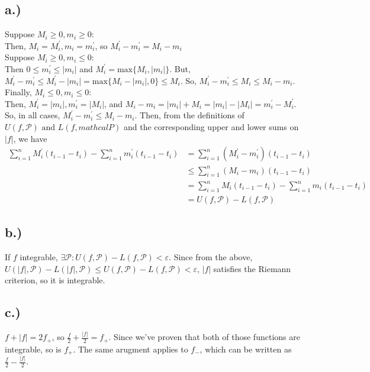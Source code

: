 \documentclass{article}
\newcommand{\mprime}{m_{i}^{\prime}}
\newcommand{\Mprime}{M_{i}^{\prime}}
\newcommand{\M}{M_{i}}
\newcommand{\m}{m_{i}}
\begin{document}
\subsection*{a.)}
Suppose $M_{i} \geq 0, m_{i} \geq 0$:\\
Then, $M_{i} = M_{i}^{\prime}, m_{i} = m_{i}^{\prime}$, so $M_{i}^{\prime} -  \mprime = \M - \m$\\

Suppose $M_{i} \geq 0, m_{i} \leq 0$:\\
Then $0\leq m_{i}^{\prime} \leq |m_{i}|$ and $M_{i}^{\prime} = \text{max}\{M_{i}, |m_{i}|\}$. But, $\Mprime - \mprime  \leq \Mprime - |\m| = \text{max}\{\M - |\m|, 0\} \leq \M$. So, $\Mprime - \mprime \leq \M \leq \M - \m$.\\

Finally, $\M \leq 0, \m \leq 0$:\\
Then, $\Mprime = |\m|, \mprime = |\M|$, and $\M - \m = |\m| + \M = |\m| - |\M| = \mprime - \Mprime.$\\

So, in all cases, $\Mprime - \mprime \leq \M - \m$.
Then, from the definitions of $U(f, \mathcal{P}) \text{ and } L(f, mathcal{P})$ and the corresponding upper and lower sums on $|f|$, we have 
\begin{align*}
\sum_{i=1}^{n}\Mprime(t_{i-1} - t_{i}) - \sum_{i=1}^{n}\mprime(t_{i-1} - t_{i}) &= \sum_{i=1}^{n}(\Mprime - \mprime)(t_{i-1} - t_{i})\\
&\leq \sum_{i=1}^{n}(\M - \m)(t_{i-1} - t_{i})\\
&= \sum_{i=1}^{n}\M(t_{i-1} - t_{i}) - \sum_{i=1}^{n}\m(t_{i-1} - t_{i})\\
&=U(f, \mathcal{P}) - L(f, \mathcal{P})
\end{align*}
\subsection*{b.)}
If $f$ integrable, $\exists \mathcal{P}: U(f, \mathcal{P})- L(f, \mathcal{P}) < \varepsilon$. Since from the above, $U(|f|, \mathcal{P}) - L(|f|, \mathcal{P}) \leq U(f, \mathcal{P}) - L(f, \mathcal{P}) < \varepsilon$, $|f|$ satisfies the Riemann criterion, so it is integrable.
\subsection*{c.)}
$f + |f| = 2f_{+}$, so $\frac{f}{2} + \frac{|f|}{2} = f_{+}$. Since we've proven that both of those functions are integrable, so is $f_{+}$. The same arugment applies to $f_{-}$, which can be written as $\frac{f}{2} - \frac{|f|}{2}$.
\end{document}

